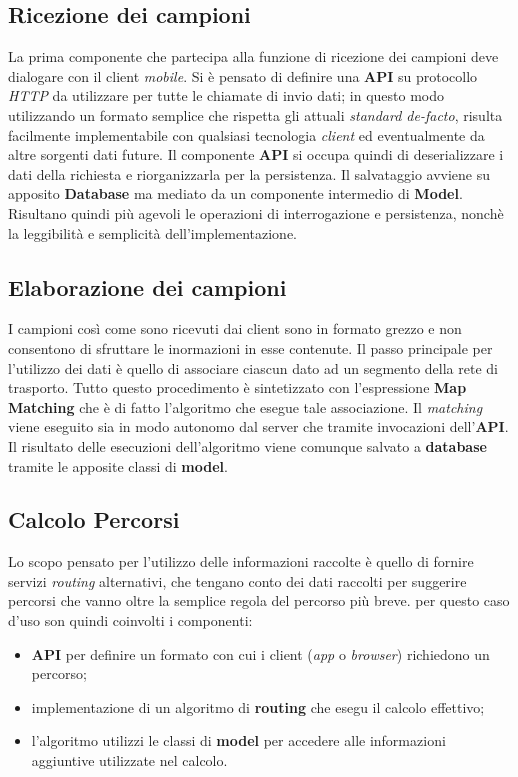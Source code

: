 \subsection{Ricezione dei campioni}
La prima componente che partecipa alla funzione di ricezione dei campioni deve dialogare con il client \emph{mobile}. Si è pensato di definire una \textbf{API} su protocollo \emph{HTTP} da utilizzare per tutte le chiamate di invio dati; in questo modo utilizzando un formato semplice che rispetta gli attuali \emph{standard de-facto}, risulta facilmente implementabile con qualsiasi tecnologia \emph{client} ed eventualmente da altre sorgenti dati future. Il componente \textbf{API} si occupa quindi di deserializzare i dati della richiesta e riorganizzarla per la persistenza. Il salvataggio avviene su apposito \textbf{Database} ma mediato da un componente intermedio di \textbf{Model}. Risultano quindi più agevoli le operazioni di interrogazione e persistenza, nonchè la leggibilità e semplicità dell'implementazione.

\subsection{Elaborazione dei campioni}
I campioni così come sono ricevuti dai client sono in formato grezzo e non consentono di sfruttare le inormazioni in esse contenute. Il passo principale per l'utilizzo dei dati è quello di associare ciascun dato ad un segmento della rete di trasporto. Tutto questo procedimento è sintetizzato con l'espressione \textbf{Map Matching} che è di fatto l'algoritmo che esegue tale associazione. Il \emph{matching} viene eseguito sia in modo autonomo dal server che tramite invocazioni dell'\textbf{API}. Il risultato delle esecuzioni dell'algoritmo viene comunque salvato a \textbf{database} tramite le apposite classi di \textbf{model}.

\subsection{Calcolo Percorsi}
Lo scopo pensato per l'utilizzo delle informazioni raccolte è quello di fornire servizi \emph{routing} alternativi, che tengano conto dei dati raccolti per suggerire percorsi che vanno oltre la semplice regola del percorso più breve. per questo caso d'uso son quindi coinvolti i componenti:
\begin{itemize}
\item \textbf{API} per definire un formato con cui i client (\emph{app} o \emph{browser}) richiedono un percorso;
\item implementazione di un algoritmo di \textbf{routing} che esegu il calcolo effettivo;
\item l'algoritmo utilizzi le classi di \textbf{model} per accedere alle informazioni aggiuntive utilizzate nel calcolo.
\end{itemize}

